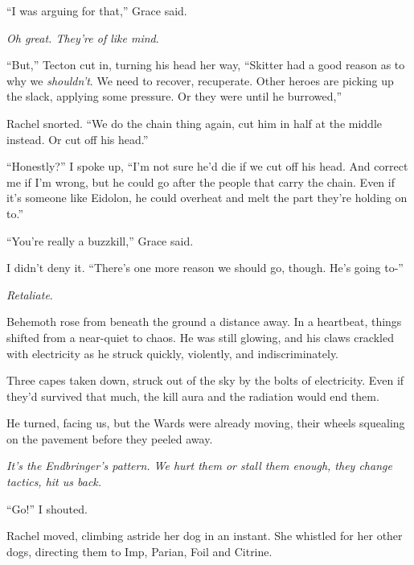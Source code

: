 ``I was arguing for that,'' Grace said.



\emph{Oh great.  They're of like mind}.



``But,'' Tecton cut in, turning his head her way, ``Skitter had a good reason as to why we \emph{shouldn't}.  We need to recover, recuperate.  Other heroes are picking up the slack, applying some pressure.  Or they were until he burrowed,''



Rachel snorted.  ``We do the chain thing again, cut him in half at the middle instead.  Or cut off his head.''



``Honestly?'' I spoke up, ``I'm not sure he'd die if we cut off his head.  And correct me if I'm wrong, but he could go after the people that carry the chain.  Even if it's someone like Eidolon, he could overheat and melt the part they're holding on to.''



``You're really a buzzkill,'' Grace said.



I didn't deny it.  ``There's one more reason we should go, though.  He's going to-''



\emph{Retaliate}.



Behemoth rose from beneath the ground a distance away.  In a heartbeat, things shifted from a near-quiet to chaos.  He was still glowing, and his claws crackled with electricity as he struck quickly, violently, and indiscriminately.



Three capes taken down, struck out of the sky by the bolts of electricity.  Even if they'd survived that much, the kill aura and the radiation would end them.



He turned, facing us, but the Wards were already moving, their wheels squealing on the pavement before they peeled away.



\emph{It's the Endbringer's pattern.  We hurt them or stall them enough, they change tactics, hit us back.}



``Go!'' I shouted.



Rachel moved, climbing astride her dog in an instant.  She whistled for her other dogs, directing them to Imp, Parian, Foil and Citrine.



